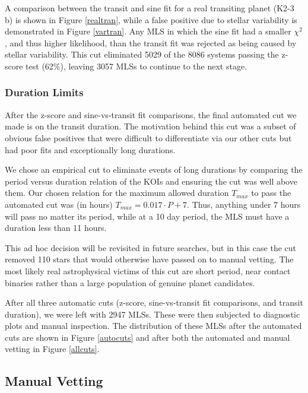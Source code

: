 \documentclass[twocolumn]{aastex62}
\newcommand{\npassz}{8086}
\newcommand{\npasssin}{3057}
\newcommand{\nelimsin}{5029}
\newcommand{\fracelimsin}{62}
\newcommand{\nelimdur}{110}
\newcommand{\npassdur}{2947}
\begin{document}
A comparison between the transit and sine fit for a real transiting
planet (K2-3 b) is shown in Figure \ref{realtran}, while a false
positive due to stellar variability is demonstrated in Figure
\ref{vartran}.  Any MLS in which the sine fit had a smaller $\chi^2$,
and thus higher likelihood, than the transit fit was rejected as being
caused by stellar variability. This cut eliminated \nelimsin{} of the
\npassz{} systems passing the z-score test (\fracelimsin{}\%), leaving
\npasssin{} MLSs to continue to the next stage.


\subsubsection{Duration Limits}
\label{durcut}

After the z-score and sine-vs-transit fit comparisons, the final
automated cut we made is on the transit duration. The motivation
behind this cut was a subset of obvious false positives that were
difficult to differentiate via our other cuts but had poor fits and
exceptionally long durations.

We chose an empirical cut to eliminate events of long durations by
comparing the period versus duration relation of the KOIs
\citep{tho18} and ensuring the cut was well above them.  Our chosen
relation for the maximum allowed duration $T_{max}$ to pass the
automated cut was (in hours) $T_{max} = 0.017 \cdot P + 7$.  Thus,
anything under 7 hours will pass no matter its period, while at a 10
day period, the MLS must have a duration less than 11 hours.

This ad hoc decision will be revisited in future searches, but in this
case the cut removed \nelimdur{} stars that would otherwise have
passed on to manual vetting. The most likely real astrophysical
victims of this cut are short period, near contact binaries rather
than a large population of genuine planet candidates.

After all three automatic cuts (z-score, sine-vs-transit fit
comparisons, and transit duration), we were left with \npassdur{}
MLSs.  These were then subjected to diagnostic plots and manual
inspection. The distribution of these MLSs after the automated cuts
are shown in Figure \ref{autocuts} and after both the automated and
manual vetting in Figure \ref{allcuts}.


\subsection{Manual Vetting}
\label{vetting}
\end{document}
